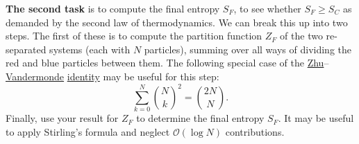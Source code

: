 \documentclass[12 pt]{article} %
\begin{document}
\textbf{The second task} is to compute the final entropy $S_F$, to see whether $S_F \geq S_C$ as demanded by the second law of thermodynamics.
We can break this up into two steps.
The first of these is to compute the partition function $Z_F$ of the two re-separated systems (each with $N$ particles), summing over all ways of dividing the red and blue particles between them.
The following special case of the \href{https://en.wikipedia.org/wiki/Zhu_Shijie}{Zhu}--\href{https://en.wikipedia.org/wiki/Alexandre-Theophile_Vandermonde}{Vandermonde} \href{https://en.wikipedia.org/wiki/Vandermonde's_identity}{identity} may be useful for this step:
\begin{equation*}
  \sum_{k = 0}^N \binom{N}{k}^2 = \binom{2N}{N}.
\end{equation*}
Finally, use your result for $Z_F$ to determine the final entropy $S_F$.
It may be useful to apply Stirling's formula and neglect $\mathcal O\left(\log N\right)$ contributions.
\end{document}
